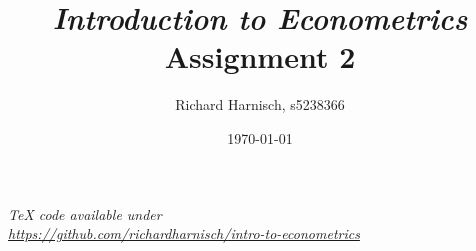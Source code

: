 \documentclass[a4paper]{article}
\begin{document}
\title{\textit{Introduction to Econometrics}\\Assignment 2}
\author{Richard Harnisch, s5238366}
\date{\today}
\maketitle

\makeatletter
\newcommand{\answer}[1]{%
    \par\medskip
    \noindent
    \hspace*{-\@totalleftmargin}%
    \fbox{%
        \parbox{\dimexpr\textwidth-2\fboxsep-2\fboxrule}{#1}%
    }%
    \par\medskip
}
\makeatother

\noindent\textit{TeX code available under\\ \url{https://github.com/richardharnisch/intro-to-econometrics}}
\end{document}
